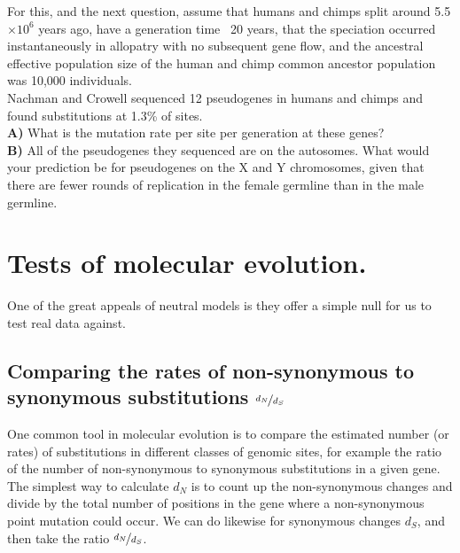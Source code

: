 



\begin{question}
For this, and the next question, assume that humans and chimps split
around 5.5$\times 10^6$ years ago, have a generation time ~20 years, that the speciation occurred instantaneously in allopatry with no subsequent gene flow, and the ancestral effective population size of the human and chimp common ancestor population was 10,000 individuals.\\
Nachman and Crowell sequenced 12 pseudogenes in humans and chimps and found substitutions at 1.3\% of sites. \\
{\bf A) } What is the mutation rate per site per generation at these genes?\\
{\bf B)} All of the pseudogenes they sequenced are on the autosomes. What
would your prediction be for pseudogenes on the X and Y chromosomes,
given that there are fewer rounds of replication in the female
germline than in the male germline.
\end{question}

\section{Tests of molecular evolution.}
One of the great appeals of neutral models is they offer a simple null
for us to test real data against. 
\subsection{Comparing the rates of non-synonymous to synonymous
substitutions $\nicefrac{d_N}{d_S}$}
One common tool in molecular evolution is to compare the estimated number (or rates) of substitutions in different classes of genomic sites, for example the ratio of the number of non-synonymous to synonymous substitutions in a given gene. The simplest way to calculate $d_N$ is to
count up the non-synonymous changes and divide by the total number of
positions in the gene where a non-synonymous point mutation could occur. We
can do likewise for synonymous changes $d_S$, and then take the ratio $\nicefrac{d_N}{d_S}$.

